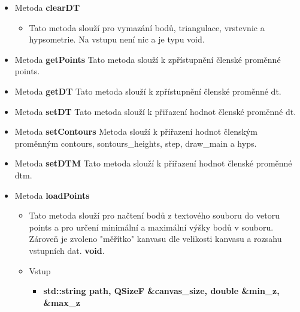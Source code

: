 \documentclass[a4paper, 12pt]{article}
\begin{document}
\begin{itemize}
\begin{itemize}

	\item Metoda \textbf{clearDT}
		\begin{itemize}
			\item Tato metoda slouží pro vymazání bodů, triangulace, vrstevnic a hypsometrie. Na vstupu není nic a je typu void.
		\end{itemize}	

	\item Metoda \textbf{getPoints}
Tato metoda slouží k zpřístupnění členské proměnné points.


	\item Metoda \textbf{getDT}
Tato metoda slouží k zpřístupnění členské proměnné dt.
	\item Metoda \textbf{setDT}
Tato metoda slouží k přiřazení hodnot členské proměnné dt.

	\item Metoda \textbf{setContours}
Metoda slouží k přiřazení hodnot členským proměnným contours, sontours\_heights, step, draw\_main a hyps.

\item Metoda \textbf{setDTM}
Tato metoda slouží k přiřazení hodnot členské proměnné dtm.

	\item Metoda \textbf{loadPoints}
\begin{itemize}
	\item Tato metoda slouží pro načtení bodů z textového souboru do vetoru points a pro určení minimální a maximální výšky bodů v souboru. Zároveň je zvoleno "měřítko" kanvasu dle velikosti kanvasu a rozsahu vstupních dat. \textbf{void}.
	\item Vstup
	\begin{itemize}
		\item \textbf{std::string path, QSizeF \&canvas\_size, double \&min\_z, \&max\_z}
	\end{itemize}
\end{itemize}
%
%


\end{itemize}
\end{itemize}
\end{document}
